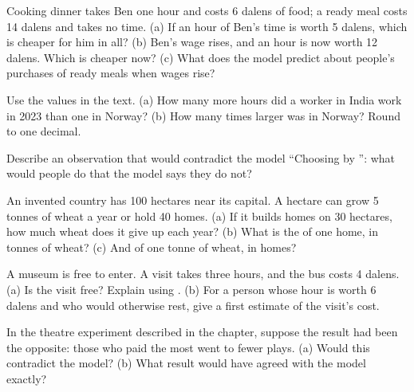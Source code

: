 \begin{exercise}[$\star\star$]\label{exo:g7:scarcity-and-opportunity-cost:7}
Cooking dinner takes Ben one hour and costs 6 dalens of food; a ready meal costs 14
dalens and takes no time. (a) If an hour of Ben's time is worth 5 dalens, which is
cheaper for him in all? (b) Ben's wage rises, and an hour is now worth 12 dalens. Which
is cheaper now? (c) What does the model predict about people's purchases of ready
meals when wages rise?
\end{exercise}

\begin{exercise}[$\star\star$]\label{exo:g7:scarcity-and-opportunity-cost:8}
Use the values in the text. (a) How many more hours did a worker in India work in 2023
than one in Norway? (b) How many times larger was  in Norway? Round
to one decimal.
\end{exercise}

\begin{exercise}[$\star\star$]\label{exo:g7:scarcity-and-opportunity-cost:9}
Describe an observation that would contradict the model ``Choosing by '': what would people do that the model says they do not?
\end{exercise}

\begin{exercise}[$\star\star\star$]\label{exo:g7:scarcity-and-opportunity-cost:10}
An invented country has 100 hectares near its capital. A hectare can grow 5 tonnes of
wheat a year or hold 40 homes. (a) If it builds homes on 30 hectares, how much wheat
does it give up each year? (b) What is the  of one home, in tonnes of
wheat? (c) And of one tonne of wheat, in homes?
\end{exercise}

\begin{exercise}[$\star\star\star$]\label{exo:g7:scarcity-and-opportunity-cost:11}
A museum is free to enter. A visit takes three hours, and the bus costs 4 dalens.
(a) Is the visit free? Explain using . (b) For a person whose hour is
worth 6 dalens and who would otherwise rest, give a first estimate of the visit's cost.
\end{exercise}

\begin{exercise}[$\star\star\star$]\label{exo:g7:scarcity-and-opportunity-cost:12}
In the theatre experiment described in the chapter, suppose the result had been the
opposite: those who paid the most went to fewer plays. (a) Would this contradict the
model? (b) What result would have agreed with the model exactly?
\end{exercise}


